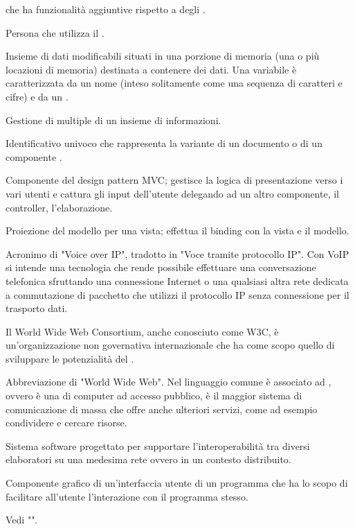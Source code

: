 { che ha funzionalità aggiuntive rispetto a degli .}

{Persona che utilizza il  .}




{Insieme di dati modificabili situati in una porzione di memoria (una o più locazioni di memoria) destinata a contenere dei dati. Una variabile è caratterizzata da un nome (inteso solitamente come una sequenza di caratteri e cifre) e da un .}

{Gestione di  multiple di un insieme di informazioni.}

{Identificativo univoco che rappresenta la variante di un documento o di un componente .}

{Componente del design pattern MVC; gestisce la logica di presentazione verso i vari utenti e cattura gli input dell'utente delegando ad un altro componente, il controller, l'elaborazione.}

{Proiezione del modello per una vista; effettua il binding con la vista e il modello.}

{Acronimo di "Voice over IP", tradotto in "Voce tramite protocollo IP". Con VoIP si intende una tecnologia che rende possibile effettuare una conversazione telefonica sfruttando una connessione Internet o una qualsiasi altra rete dedicata a commutazione di pacchetto che utilizzi il protocollo IP senza connessione per il trasporto dati.}



{Il World Wide Web Consortium, anche conosciuto come W3C, è un'organizzazione non governativa internazionale che ha come scopo quello di sviluppare le potenzialità del .}

{Abbreviazione di "World Wide Web". Nel linguaggio comune è associato ad , ovvero è una  di computer ad accesso pubblico, è il maggior sistema di comunicazione di massa che offre anche ulteriori servizi, come ad esempio condividere e cercare risorse.}

{Sistema software progettato per supportare l'interoperabilità tra diversi elaboratori su una medesima rete ovvero in un contesto distribuito.}

{Componente grafico di un'interfaccia utente di un programma che ha lo scopo di facilitare all'utente l'interazione con il programma stesso.}

{Vedi "".}
